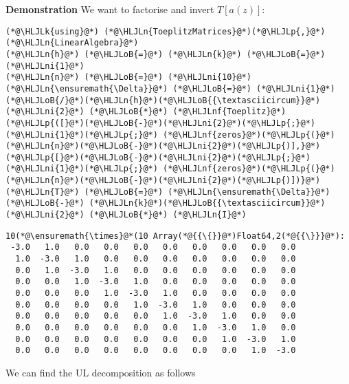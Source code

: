 \documentclass[12pt,landscape]{article}
\newcommand{\HLJLk}[1]{\textcolor[RGB]{148,91,176}{\textbf{#1}}}
\newcommand{\HLJLn}[1]{#1}
\newcommand{\HLJLnf}[1]{\textcolor[RGB]{66,102,213}{#1}}
\newcommand{\HLJLni}[1]{\textcolor[RGB]{59,151,46}{#1}}
\newcommand{\HLJLoB}[1]{\textcolor[RGB]{102,102,102}{\textbf{#1}}}
\newcommand{\HLJLp}[1]{#1}
\begin{document}
{\textbf{Demonstration} We want to factorise and invert $T[a(z)]$:


\begin{lstlisting}
(*@\HLJLk{using}@*) (*@\HLJLn{ToeplitzMatrices}@*)(*@\HLJLp{,}@*) (*@\HLJLn{LinearAlgebra}@*)
(*@\HLJLn{h}@*) (*@\HLJLoB{=}@*) (*@\HLJLn{k}@*) (*@\HLJLoB{=}@*) (*@\HLJLni{1}@*)
(*@\HLJLn{n}@*) (*@\HLJLoB{=}@*) (*@\HLJLni{10}@*)
(*@\HLJLn{\ensuremath{\Delta}}@*) (*@\HLJLoB{=}@*) (*@\HLJLni{1}@*)(*@\HLJLoB{/}@*)(*@\HLJLn{h}@*)(*@\HLJLoB{{\textasciicircum}}@*)(*@\HLJLni{2}@*) (*@\HLJLoB{*}@*) (*@\HLJLnf{Toeplitz}@*)(*@\HLJLp{([}@*)(*@\HLJLoB{-}@*)(*@\HLJLni{2}@*)(*@\HLJLp{;}@*) (*@\HLJLni{1}@*)(*@\HLJLp{;}@*) (*@\HLJLnf{zeros}@*)(*@\HLJLp{(}@*)(*@\HLJLn{n}@*)(*@\HLJLoB{-}@*)(*@\HLJLni{2}@*)(*@\HLJLp{)],}@*) (*@\HLJLp{[}@*)(*@\HLJLoB{-}@*)(*@\HLJLni{2}@*)(*@\HLJLp{;}@*) (*@\HLJLni{1}@*)(*@\HLJLp{;}@*) (*@\HLJLnf{zeros}@*)(*@\HLJLp{(}@*)(*@\HLJLn{n}@*)(*@\HLJLoB{-}@*)(*@\HLJLni{2}@*)(*@\HLJLp{)])}@*)
(*@\HLJLn{T}@*) (*@\HLJLoB{=}@*) (*@\HLJLn{\ensuremath{\Delta}}@*) (*@\HLJLoB{-}@*) (*@\HLJLn{k}@*)(*@\HLJLoB{{\textasciicircum}}@*)(*@\HLJLni{2}@*) (*@\HLJLoB{*}@*) (*@\HLJLn{I}@*)
\end{lstlisting}

\begin{lstlisting}
10(*@\ensuremath{\times}@*(10 Array(*@{{\{}}@*)Float64,2(*@{{\}}}@*):
 -3.0   1.0   0.0   0.0   0.0   0.0   0.0   0.0   0.0   0.0
  1.0  -3.0   1.0   0.0   0.0   0.0   0.0   0.0   0.0   0.0
  0.0   1.0  -3.0   1.0   0.0   0.0   0.0   0.0   0.0   0.0
  0.0   0.0   1.0  -3.0   1.0   0.0   0.0   0.0   0.0   0.0
  0.0   0.0   0.0   1.0  -3.0   1.0   0.0   0.0   0.0   0.0
  0.0   0.0   0.0   0.0   1.0  -3.0   1.0   0.0   0.0   0.0
  0.0   0.0   0.0   0.0   0.0   1.0  -3.0   1.0   0.0   0.0
  0.0   0.0   0.0   0.0   0.0   0.0   1.0  -3.0   1.0   0.0
  0.0   0.0   0.0   0.0   0.0   0.0   0.0   1.0  -3.0   1.0
  0.0   0.0   0.0   0.0   0.0   0.0   0.0   0.0   1.0  -3.0
\end{lstlisting}


We can find the UL decomposition as follows


}
\end{document}
